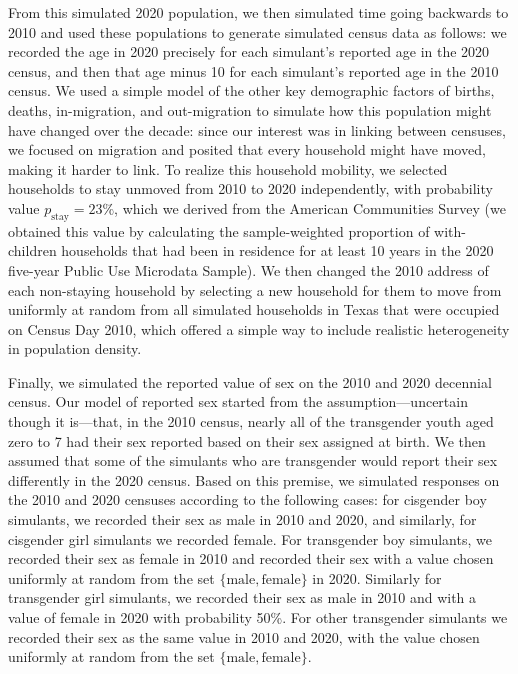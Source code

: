 \documentclass{jpc} %
\theoremstyle{plain}\newtheorem{satz}[thm]{Satz} %
\begin{document}
From this simulated 2020 population, we then simulated time going backwards to 2010 and used these populations to generate simulated census data as follows: we recorded the age in 2020 precisely for each simulant's reported age in the 2020 census, and then that age minus 10 for each simulant's reported age in the 2010 census.  We used a simple model of the other key demographic factors of births, deaths, in-migration, and out-migration to simulate how this population might have changed over the decade: since our interest was in linking between censuses, we focused on migration and posited that every household might have moved, making it harder to link. To realize this household mobility, we selected households to stay unmoved from 2010 to 2020 independently, with probability value $p_{\text{stay}} = 23\%$, which we derived from the American Communities Survey (we obtained this value by calculating the sample-weighted proportion of with-children households that had been in residence for at least 10 years in the 2020 five-year Public Use Microdata Sample).  We then changed the 2010 address of each non-staying household by selecting a new household for them to move from uniformly at random from all simulated households in Texas that were occupied on Census Day 2010, which offered a simple way to include realistic heterogeneity in population density.

Finally, we simulated the reported value of sex on the 2010 and 2020 decennial census. Our model of reported sex started from the assumption---uncertain though it is---that, in the 2010 census, nearly all of the transgender youth aged zero to 7 had their sex reported based on their sex assigned at birth. We then assumed that some of the simulants who are transgender would report their sex differently in the 2020 census.
Based on this premise, we simulated responses on the 2010 and 2020 censuses according to the following cases: for cisgender boy simulants, we recorded their sex as male in 2010 and 2020, and similarly, for cisgender girl simulants we recorded female.  For transgender boy simulants, we recorded their sex as female in 2010 and recorded their sex with a value chosen uniformly at random from the set $\{\text{male}, \text{female}\}$ in 2020.  Similarly for transgender girl simulants, we recorded their sex as male in 2010 and with a value of female in 2020 with probability 50\%.  For other transgender simulants we recorded their sex as the same value in 2010 and 2020, with the value chosen uniformly at random from the set $\{\text{male}, \text{female}\}$.
\end{document}
